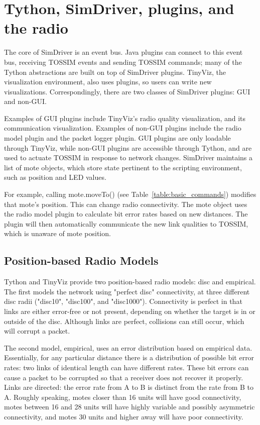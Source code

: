 \documentclass[10pt]{article}
\newcommand{\name}{{Tython}\xspace}
\begin{document}
\section{\name, SimDriver, plugins, and the radio}

The core of SimDriver is an event bus. Java plugins can connect to this
event bus, receiving TOSSIM events and sending TOSSIM commands; many
of the \name abstractions are built on top of SimDriver plugins. TinyViz,
the visualization environment, also uses plugins, so users can write new
visualizations. Correspondingly, there are two classes of SimDriver plugins:
GUI and non-GUI.

Examples of GUI plugins include TinyViz's radio quality visualization, 
and its communication visualization. Examples of non-GUI plugins include 
the radio model plugin and the packet logger plugin. GUI plugins are only
loadable through TinyViz, while non-GUI plugins are accessible through
\name, and are used to actuate TOSSIM in response to network changes.
SimDriver maintains a list of mote objects, which store state pertinent
to the scripting environment, such as position and LED values.

For example, calling mote.moveTo() (see Table~\ref{table:basic_commands}) 
modifies that mote's position. This can change radio connectivity. The
mote object uses the radio model plugin to calculate bit error rates
based on new distances. The plugin will then automatically communicate the
new link qualities to TOSSIM, which is unaware of mote position.

\subsection{Position-based Radio Models}

\name and TinyViz provide two position-based radio models: disc and
empirical. The first models the network using "perfect disc" connectivity,
at three different disc radii ("disc10", "disc100", and "disc1000"). 
Connectivity is perfect
in that links are either error-free or not present, depending on
whether the target is in or outside of the disc. Although
links are perfect, collisions can still occur, which will corrupt a packet.

The second model, empirical, uses an error distribution based on
empirical data. Essentially, for any particular distance there is a 
distribution of possible bit error rates: two links of identical length
can have different rates. These bit errors can cause a packet to be
corrupted so that a receiver does not recover it properly. Links are
directed: the error rate from A to B is distinct from the rate
from B to A. Roughly speaking, motes closer than 16 units will have
good connectivity, motes between 16 and 28 units will have highly variable
and possibly asymmetric connectivity, and motes 30 units and higher away
will have poor connectivity. 
\end{document}
